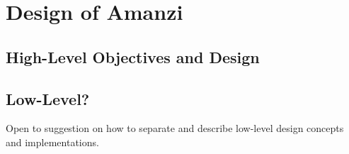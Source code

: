 %
%

\section{Design of Amanzi}

\subsection{High-Level Objectives and Design}

\subsection{Low-Level?}

Open to suggestion on how to separate and describe low-level design
concepts and implementations.






